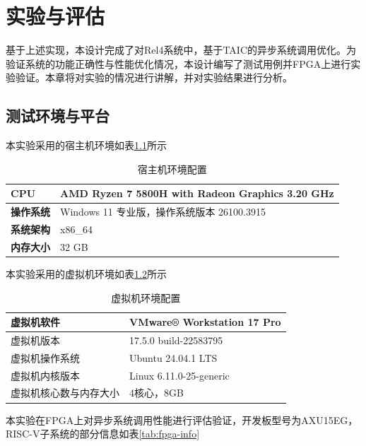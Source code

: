 \chapter{实验与评估}

基于上述实现，本设计完成了对Rel4系统中，基于TAIC的异步系统调用优化。为验证系统的功能正确性与性能优化情况，本设计编写了测试用例并FPGA上进行实验验证。本章将对实验的情况进行讲解，并对实验结果进行分析。

\section{测试环境与平台}

本实验采用的宿主机环境如表\ref{tab:experiment-platform}所示

\begin{table}[htbp]
\centering
\caption{宿主机环境配置}\label{tab:experiment-platform}
\renewcommand{\arraystretch}{1.2}
\begin{tabular}{|l|l|}
\hline
\textbf{CPU} & AMD Ryzen 7 5800H with Radeon Graphics 3.20 GHz \\
\hline
\textbf{操作系统} & Windows 11 专业版，操作系统版本	26100.3915 \\
\hline
\textbf{系统架构} & x86\_64 \\
\hline
\textbf{内存大小} & 32 GB \\
\hline
\end{tabular}
\end{table}


本实验采用的虚拟机环境如表\ref{tab:vmware-platform}所示

\begin{table}[htbp]
\centering
\caption{虚拟机环境配置}\label{tab:vmware-platform}
\renewcommand{\arraystretch}{1.2}
\begin{tabular}{|l|l|}
\hline
虚拟机软件 & VMware® Workstation 17 Pro \\
\hline
虚拟机版本 & 17.5.0 build-22583795 \\
\hline
虚拟机操作系统 & Ubuntu 24.04.1 LTS \\
\hline
虚拟机内核版本 & Linux 6.11.0-25-generic \\
\hline
虚拟机核心数与内存大小 & 4核心，8GB \\
\hline
\end{tabular}
\end{table}

本实验在FPGA上对异步系统调用性能进行评估验证，开发板型号为AXU15EG，RISC-V子系统的部分信息如表\ref{tab:fpga-info}

